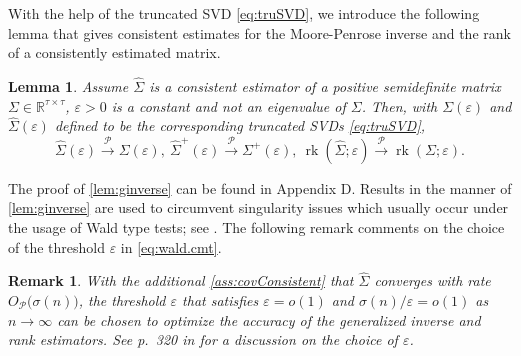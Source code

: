 \documentclass[12pt]{article}
\numberwithin{thm}{section}
\numberwithin{defn}{section}
\newtheorem{lem}{Lemma}
\numberwithin{lem}{section}
\numberwithin{prop}{section}
\numberwithin{cor}{section}
\newtheorem{rem}{Remark}
\numberwithin{rem}{section}
\newcommand{\rank}{\operatorname{rk}}
\begin{document}
With the help of the truncated SVD \eqref{eq:truSVD}, we introduce the following lemma that gives consistent estimates for the Moore-Penrose inverse and the rank of a consistently estimated matrix.
\begin{lem}\label{lem:ginverse}
Assume $\widehat{\Sigma}$ is a consistent estimator of a positive semidefinite matrix $\Sigma \in \mathbb{R}^{\tau \times \tau}$, $\varepsilon > 0$ is a constant and not an eigenvalue of $\Sigma$. Then, with $\Sigma(\varepsilon)$ and $\widehat{\Sigma}(\varepsilon)$ defined to be the corresponding truncated SVDs \eqref{eq:truSVD}, 
\begin{equation}\label{eq:wald.cmt}
    \widehat{\Sigma}(\varepsilon) \xrightarrow{\mathcal{P}} \Sigma(\varepsilon), ~ \widehat{\Sigma}^+(\varepsilon) \xrightarrow{\mathcal{P}} \Sigma^+(\varepsilon), ~ \rank(\widehat{\Sigma}; \varepsilon) \xrightarrow{\mathcal{P}} \rank(\Sigma; \varepsilon).
\end{equation}
\end{lem}

The proof of \autoref{lem:ginverse} can be found in {\color{cyan} Appendix D}.
Results in the manner of \autoref{lem:ginverse} are used to circumvent singularity issues which usually occur under the usage of Wald type tests; see %
\cite{hadi1990note, ratsimalahelo2001rank}.
The following remark comments on the choice of the threshold $\varepsilon$ in \eqref{eq:wald.cmt}.

\begin{rem}\label{rem:epsilon.order}
With the additional \autoref{ass:covConsistent} that $\widehat{\Sigma}$ converges with rate $O_\mathcal{P}\big(\sigma(n)\big)$, the threshold $\varepsilon$ that satisfies $\varepsilon = o(1)$ and $\sigma(n)/\varepsilon = o(1)$ as $n \to \infty$ can be chosen to optimize the accuracy of the generalized inverse and rank estimators. See p.\ 320 in \cite{lutkepohl1997modified} for a discussion on the choice of $\varepsilon$.
\end{rem}



\end{document}
